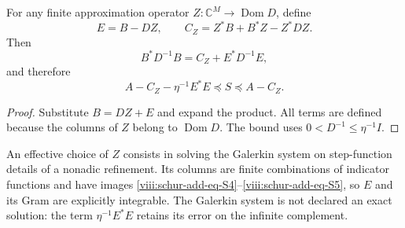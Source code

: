 \begin{theorem}
\label{viii:schur-add-residual}
For any finite
approximation operator \(Z:\mathbb C^M\to\operatorname{Dom}D\), define
\begin{equation}
E=B-DZ,\qquad C_Z=Z^*B+B^*Z-Z^*DZ.
\label{viii:schur-add-display-15}
\end{equation}
Then
\begin{equation}
B^*D^{-1}B=C_Z+E^*D^{-1}E,
\label{viii:schur-add-display-16}
\end{equation}
and therefore
\begin{equation}
\boxed{A-C_Z-\eta^{-1}E^*E\preceq S\preceq A-C_Z.}
\label{viii:schur-add-eq-S7}
\end{equation}
\end{theorem}
\begin{proof}
Substitute \(B=DZ+E\) and expand the product. All
terms are defined because the columns of \(Z\) belong to
\(\operatorname{Dom}D\). The bound uses \(0<D^{-1}\leq\eta^{-1}I\).
\end{proof}

An effective choice of \(Z\) consists in solving the
Galerkin system on step-function details of a nonadic refinement. Its
columns are finite combinations of indicator functions and have images
\eqref{viii:schur-add-eq-S4}--\eqref{viii:schur-add-eq-S5}, so \(E\) and its Gram are explicitly integrable. The
Galerkin system is not declared an exact solution: the term
\(\eta^{-1}E^*E\) retains its error on the infinite complement.


